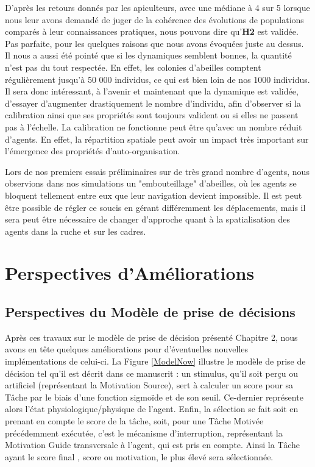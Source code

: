 		 D'après les retours donnés par les apiculteurs, avec une médiane à 4 sur 5 lorsque nous leur avons demandé de juger de la cohérence des évolutions de populations comparés à leur connaissances pratiques, nous pouvons dire qu'\textbf{H2} est validée. Pas parfaite, pour les quelques raisons que nous avons évoquées juste au dessus. Il nous a aussi été pointé que si les dynamiques semblent bonnes, la quantité n'est pas du tout respectée. En effet, les colonies d'abeilles comptent régulièrement jusqu'à 50 000 individus, ce qui est bien loin de nos 1000 individus. Il sera donc intéressant, à l'avenir et maintenant que la dynamique est validée, d'essayer d'augmenter drastiquement le nombre d'individu, afin d'observer si la calibration ainsi que ses propriétés sont toujours valident ou si elles ne passent pas à l'échelle. La calibration ne fonctionne peut être qu'avec un nombre réduit d'agents. En effet, la répartition spatiale peut avoir un impact très important sur l'émergence des propriétés d'auto-organisation.
		 
		 Lors de nos premiers essais préliminaires sur de très grand nombre d'agents, nous observions dans nos simulations un "embouteillage" d'abeilles, où les agents se bloquent tellement entre eux que leur navigation devient impossible. Il est peut être possible de régler ce soucis en gérant différemment les déplacements, mais il sera peut être nécessaire de changer d'approche quant à la spatialisation des agents dans la ruche et sur les cadres.
	
	
	\section{Perspectives d'Améliorations}
	\label{sectionPerspectivesSMA}
	
	\subsection{Perspectives du Modèle de prise de décisions}
	Après ces travaux sur le modèle de prise de décision présenté Chapitre 2, nous avons en tête quelques améliorations pour d'éventuelles nouvelles implémentations de celui-ci. La Figure \ref{ModelNow} illustre le modèle de prise de décision tel qu'il est décrit dans ce manuscrit : un stimulus, qu'il soit perçu ou artificiel (représentant la Motivation Source), sert à calculer un score pour sa Tâche par le biais d'une fonction sigmoïde et de son seuil. Ce-dernier représente alors l'état physiologique/physique de l'agent. Enfin, la sélection se fait soit en prenant en compte le score de la tâche, soit, pour une Tâche Motivée précédemment exécutée, c'est le mécanisme d'interruption, représentant la Motivation Guide transversale à l'agent, qui est pris en compte. Ainsi la Tâche ayant le score final , score ou motivation, le plus élevé sera sélectionnée.
	
